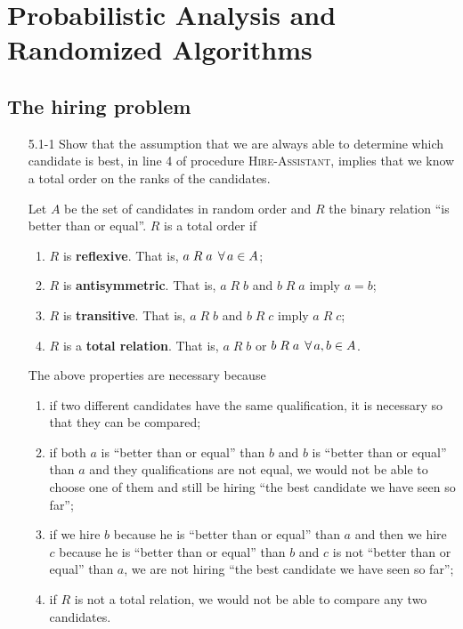 \chapter{Probabilistic Analysis and Randomized Algorithms}

\section{The hiring problem}

\begin{enumerate}

\item[5.1{-}1]{Show that the assumption that we are always able to determine
which candidate is best, in line 4 of procedure \textsc{Hire-Assistant}, implies
that we know a total order on the ranks of the candidates.}

\begin{framed}
Let $A$ be the set of candidates in random order and $R$ the binary relation
``is better than or equal''. $R$ is a total order if
\begin{enumerate}
  \item $R$ is \textbf{reflexive}. That is, $a\;R\;a \; \operatorname{\forall} a \in A$;
  \item $R$ is \textbf{antisymmetric}. That is, $a\;R\;b$ and $b\;R\;a$ imply $a = b$;
  \item $R$ is \textbf{transitive}. That is, $a\;R\;b$ and $b\;R\;c$ imply $a\;R\;c$;
  \item $R$ is a \textbf{total relation}. That is, $a\;R\;b$ or $b\;R\;a \; \operatorname{\forall} a, b \in A$.
\end{enumerate}

The above properties are necessary because
  \begin{enumerate}
    \item if two different candidates have the same qualification, it is
      necessary so that they can be compared;
    \item if both $a$ is ``better than or equal'' than $b$ and $b$ is ``better
      than or equal'' than $a$ and they qualifications are not equal, we would
      not be able to choose one of them and still be hiring ``the best candidate
      we have seen so far'';
    \item if we hire $b$ because he is ``better than or equal'' than $a$ and
      then we hire $c$ because he is ``better than or equal'' than $b$ and $c$
      is not ``better than or equal'' than $a$, we are not hiring ``the best
      candidate we have seen so far'';
    \item if $R$ is not a total relation, we would not be able to compare any
      two candidates.
\end{enumerate}
\end{framed}


\end{enumerate}
